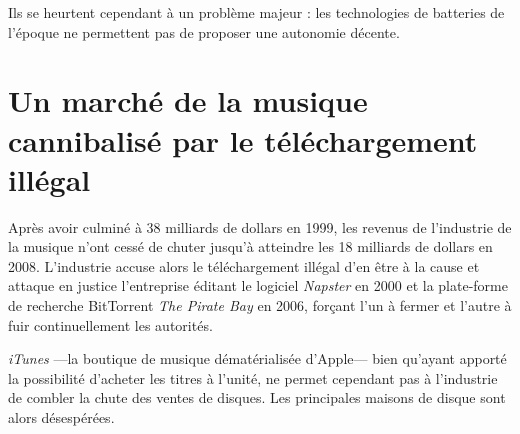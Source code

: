 Ils se heurtent cependant à un problème majeur : les technologies de batteries de l'époque ne permettent pas de proposer une autonomie décente.

\section{Un marché de la musique cannibalisé par le téléchargement illégal}

Après avoir culminé à 38 milliards de dollars en 1999\supercite{IFPI2000Report}, les revenus de l'industrie de la musique n'ont cessé de chuter jusqu'à atteindre les 18 milliards de dollars en 2008\supercite{IFPI2008Report}. L'industrie accuse alors le téléchargement illégal d'en être à la cause et attaque en justice l'entreprise éditant le logiciel \textit{Napster} en 2000 et la plate-forme de recherche BitTorrent \textit{The Pirate Bay} en 2006, forçant l'un à fermer et l'autre à fuir continuellement les autorités. 

\textit{iTunes} ---la boutique de musique dématérialisée d'Apple--- bien qu'ayant apporté la possibilité d'acheter les titres à l'unité, ne permet cependant pas à l'industrie de combler la chute des ventes de disques. Les principales maisons de disque sont alors désespérées.